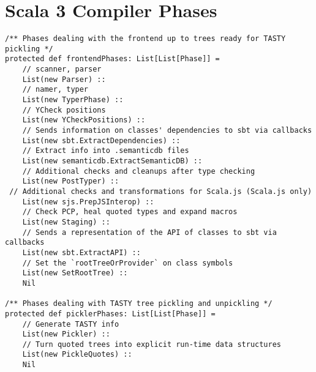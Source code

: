 \documentclass[letterpaper,12pt,titlepage,oneside,final]{book}
\begin{document}
\chapter{Scala 3 Compiler Phases}
\label{appendix:dotty-phases}
\begin{verbatim}
/** Phases dealing with the frontend up to trees ready for TASTY pickling */
protected def frontendPhases: List[List[Phase]] =
	// scanner, parser
	List(new Parser) ::     
	// namer, typer                  
	List(new TyperPhase) ::   
	// YCheck positions                
	List(new YCheckPositions) ::         
	// Sends information on classes' dependencies to sbt via callbacks 
	List(new sbt.ExtractDependencies) ::   
	// Extract info into .semanticdb files  
	List(new semanticdb.ExtractSemanticDB) :: 
	// Additional checks and cleanups after type checking
	List(new PostTyper) ::      
 // Additional checks and transformations for Scala.js (Scala.js only)              
	List(new sjs.PrepJSInterop) ::  
	// Check PCP, heal quoted types and expand macros         
	List(new Staging) ::      
	// Sends a representation of the API of classes to sbt via callbacks                
	List(new sbt.ExtractAPI) ::               
	// Set the `rootTreeOrProvider` on class symbols
	List(new SetRootTree) ::                  
	Nil

/** Phases dealing with TASTY tree pickling and unpickling */
protected def picklerPhases: List[List[Phase]] =
	// Generate TASTY info
	List(new Pickler) ::
	// Turn quoted trees into explicit run-time data structures            
	List(new PickleQuotes) ::       
	Nil


\end{verbatim}
\end{document}
